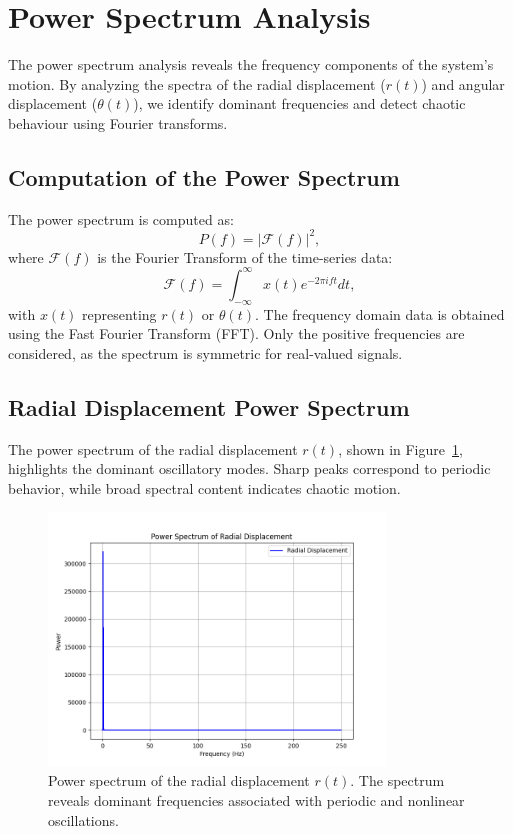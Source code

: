 \documentclass[12pt]{article}
\begin{document}
\section{Power Spectrum Analysis}

The power spectrum analysis reveals the frequency components of the system's motion. By analyzing the spectra of the radial displacement (\( r(t) \)) and angular displacement (\( \theta(t) \)), we identify dominant frequencies and detect chaotic behaviour using Fourier transforms.

\subsection{Computation of the Power Spectrum}
The power spectrum is computed as:
\[
P(f) = |\mathcal{F}(f)|^2,
\]
where \( \mathcal{F}(f) \) is the Fourier Transform of the time-series data:
\[
\mathcal{F}(f) = \int_{-\infty}^{\infty} x(t) e^{-2\pi i f t} dt,
\]
with \( x(t) \) representing \( r(t) \) or \( \theta(t) \). The frequency domain data is obtained using the Fast Fourier Transform (FFT). Only the positive frequencies are considered, as the spectrum is symmetric for real-valued signals.

\subsection{Radial Displacement Power Spectrum}
The power spectrum of the radial displacement \( r(t) \), shown in Figure~\ref{fig:power_spectrum_radial}, highlights the dominant oscillatory modes. Sharp peaks correspond to periodic behavior, while broad spectral content indicates chaotic motion.

\begin{figure}[h!]
    \centering
    \includegraphics[width=0.8\textwidth]{power_spectrum_radial.png}
    \caption{Power spectrum of the radial displacement \( r(t) \). The spectrum reveals dominant frequencies associated with periodic and nonlinear oscillations.}
    \label{fig:power_spectrum_radial}
\end{figure}
\end{document}
